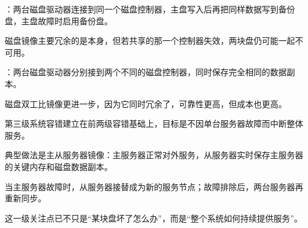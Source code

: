 \begin{points}
  \item {}：两台磁盘驱动器连接到同一个磁盘控制器，主盘写入后再把同样数据写到备份盘，主盘故障时启用备份盘。
  \item 磁盘镜像主要冗余的是本身，但若共享的那一个控制器失效，两块盘仍可能一起不可用。
  \item {}：两台磁盘驱动器分别接到两个不同的磁盘控制器，同时保存完全相同的数据副本。
  \item 磁盘双工比镜像更进一步，因为它同时冗余了，可靠性更高，但成本也更高。
\end{points}


\begin{points}
  \item 第三级系统容错建立在前两级容错基础上，目标是不因单台服务器故障而中断整体服务。
  \item 典型做法是主从服务器镜像：主服务器正常对外服务，从服务器实时保存主服务器的关键内存和磁盘数据副本。
  \item 当主服务器故障时，从服务器接替成为新的服务节点；故障排除后，两台服务器再重新同步。
  \item 这一级关注点已不只是“某块盘坏了怎么办”，而是“整个系统如何持续提供服务”。
\end{points}
